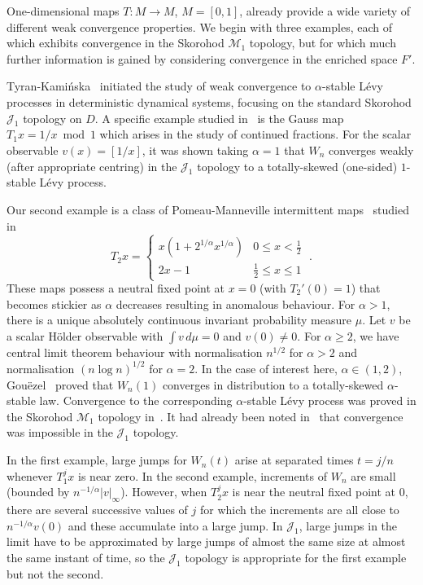 \documentclass[12pt]{article}
\numberwithin{equation}{section}
\newcommand{\cJ}{{\mathcal J}}
\newcommand{\cM}{{\mathcal M}}
\begin{document}
One-dimensional maps $T:M\to M$, $M=[0,1]$, already provide a wide variety of different weak convergence properties. 
We begin with three examples, each of which exhibits convergence in the Skorohod $\cM_1$ topology, but for which much further information is gained by considering convergence in the enriched space $F'$.

\begin{example} \label{ex:1}
Tyran-Kami\'nska~\cite{TyranKaminska10} initiated the study of weak convergence to $\alpha$-stable L\'evy processes in deterministic dynamical systems, focusing on the standard Skorohod $\cJ_1$ topology on $D$. A specific example studied in~\cite{TyranKaminska10} is the Gauss map 
$T_1x=1/x \bmod1$
which arises in the study of continued fractions.
For the scalar observable $v(x)=[1/x]$, it was shown taking $\alpha=1$
that 
$W_n$ converges weakly (after appropriate centring) in the $\cJ_1$ topology to a totally-skewed (one-sided) $1$-stable L\'evy process.
\end{example}

\begin{example} \label{ex:2}
Our second example is a class of Pomeau-Manneville intermittent maps~\cite{PomeauManneville80} studied in~\cite{LSV99}
\[
T_2x=\begin{cases} x(1+2^{1/\alpha}x^{1/\alpha}) & 0\le x<\frac12 \\
2x-1 & \frac12 \le x\le 1
\end{cases} \;.
\]
These maps possess a neutral fixed point at $x=0$ (with $T_2'(0)=1$) that becomes stickier as $\alpha$ decreases resulting in anomalous behaviour.
For $\alpha>1$, there is a unique absolutely continuous invariant probability measure $\mu$.
Let $v$ be a scalar H\"older observable with $\int v\,d\mu=0$ and $v(0)\neq0$.
For $\alpha\ge2$, we have central limit theorem behaviour with normalisation $n^{1/2}$ for $\alpha>2$ and normalisation $(n\log n)^{1/2}$ for $\alpha=2$.
In the case of interest here, $\alpha\in(1,2)$, Gou\"ezel~\cite{Gouezel04} proved that $W_n(1)$ converges in distribution to a totally-skewed $\alpha$-stable law.
Convergence to the corresponding $\alpha$-stable L\'evy process was proved in the Skorohod $\cM_1$ topology in~\cite{MZ15}. It had already been noted in~\cite{TyranKaminska10} that convergence was impossible in the $\cJ_1$ topology.
\end{example}

In the first example, large jumps for $W_n(t)$ arise at separated times $t=j/n$ whenever $T_1^jx$ is near zero. In the second example, increments of $W_n$ are small (bounded by $n^{-1/\alpha}|v|_\infty$). However, when $T_2^jx$ is near the neutral fixed point at $0$, there are several successive values of $j$ for which the increments are all close to $n^{-1/\alpha}v(0)$ and these accumulate into a large jump. In $\cJ_1$, large jumps in the limit have to be approximated by large jumps of almost the same size at almost the same instant of time, so the $\cJ_1$ topology is appropriate for the first example but not the second. 
\end{document}
